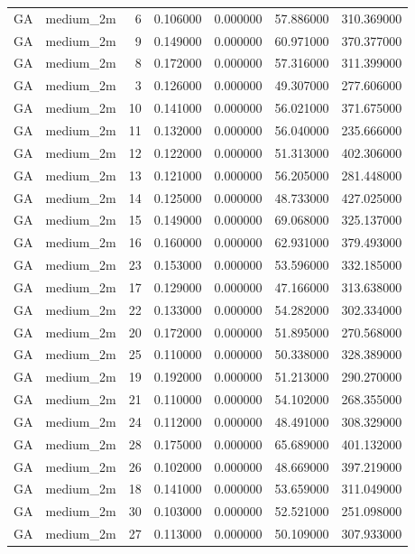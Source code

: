 \begin{tabular}{llrrrrr}
GA & medium_2m & 6 & 0.106000 & 0.000000 & 57.886000 & 310.369000 \\
GA & medium_2m & 9 & 0.149000 & 0.000000 & 60.971000 & 370.377000 \\
GA & medium_2m & 8 & 0.172000 & 0.000000 & 57.316000 & 311.399000 \\
GA & medium_2m & 3 & 0.126000 & 0.000000 & 49.307000 & 277.606000 \\
GA & medium_2m & 10 & 0.141000 & 0.000000 & 56.021000 & 371.675000 \\
GA & medium_2m & 11 & 0.132000 & 0.000000 & 56.040000 & 235.666000 \\
GA & medium_2m & 12 & 0.122000 & 0.000000 & 51.313000 & 402.306000 \\
GA & medium_2m & 13 & 0.121000 & 0.000000 & 56.205000 & 281.448000 \\
GA & medium_2m & 14 & 0.125000 & 0.000000 & 48.733000 & 427.025000 \\
GA & medium_2m & 15 & 0.149000 & 0.000000 & 69.068000 & 325.137000 \\
GA & medium_2m & 16 & 0.160000 & 0.000000 & 62.931000 & 379.493000 \\
GA & medium_2m & 23 & 0.153000 & 0.000000 & 53.596000 & 332.185000 \\
GA & medium_2m & 17 & 0.129000 & 0.000000 & 47.166000 & 313.638000 \\
GA & medium_2m & 22 & 0.133000 & 0.000000 & 54.282000 & 302.334000 \\
GA & medium_2m & 20 & 0.172000 & 0.000000 & 51.895000 & 270.568000 \\
GA & medium_2m & 25 & 0.110000 & 0.000000 & 50.338000 & 328.389000 \\
GA & medium_2m & 19 & 0.192000 & 0.000000 & 51.213000 & 290.270000 \\
GA & medium_2m & 21 & 0.110000 & 0.000000 & 54.102000 & 268.355000 \\
GA & medium_2m & 24 & 0.112000 & 0.000000 & 48.491000 & 308.329000 \\
GA & medium_2m & 28 & 0.175000 & 0.000000 & 65.689000 & 401.132000 \\
GA & medium_2m & 26 & 0.102000 & 0.000000 & 48.669000 & 397.219000 \\
GA & medium_2m & 18 & 0.141000 & 0.000000 & 53.659000 & 311.049000 \\
GA & medium_2m & 30 & 0.103000 & 0.000000 & 52.521000 & 251.098000 \\
GA & medium_2m & 27 & 0.113000 & 0.000000 & 50.109000 & 307.933000 \\

\end{tabular}
